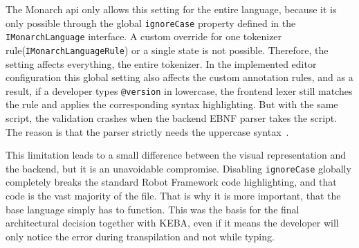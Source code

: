 The Monarch \gls{api} only allows this setting for the entire language, because it is only possible through the global \texttt{ignoreCase} property defined in the \texttt{IMonarchLanguage} interface. A custom override for one tokenizer rule(\texttt{IMonarchLanguageRule}) or a single state is not possible. Therefore, the setting affects everything, the entire tokenizer. In the implemented editor configuration this global setting also affects the custom annotation rules, and as a result, if a developer types \texttt{@version} in lowercase, the frontend lexer still matches the rule and applies the corresponding syntax highlighting. But with the same script, the validation crashes when the backend EBNF parser takes the script. The reason is that the parser strictly needs the uppercase syntax~\cite{MonacoMonarchTypes0341}.

This limitation leads to a small difference between the visual representation and the backend, but it is an unavoidable compromise. Disabling \texttt{ignoreCase} globally completely breaks the standard Robot Framework code highlighting, and that code is the vast majority of the file. That is why it is more important, that the base language simply has to function. This was the basis for the final architectural decision together with KEBA, even if it means the developer will only notice the error during transpilation and not while typing.

